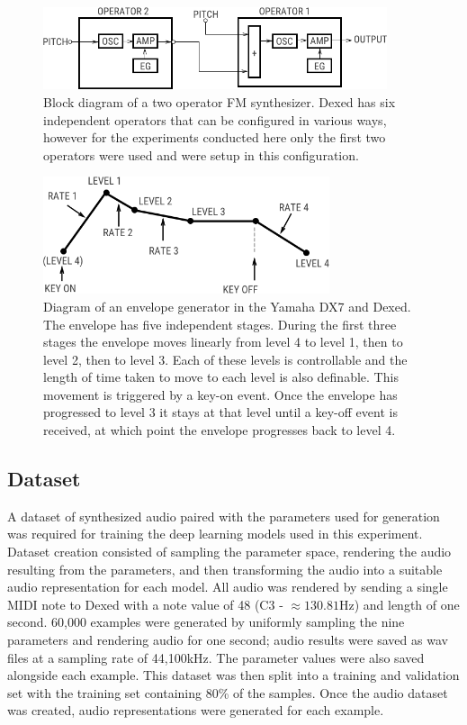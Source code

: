 \begin{figure}[ht]
    \centering
    \includegraphics[width=0.9\textwidth]{figures/spiegelib/two_op_fm_block.png}
    \caption{Block diagram of a two operator FM synthesizer. Dexed has six independent operators that can be configured in various ways, however for the experiments conducted here only the first two operators were used and were setup in this configuration.}
    \label{fig:two_op_fm_block}
\end{figure}

\begin{figure}[ht]
    \centering
    \includegraphics[width=0.75\textwidth]{figures/spiegelib/Yamaha DX7 Envelope.png}
    \caption{Diagram of an envelope generator in the Yamaha DX7 and Dexed. The envelope has five independent stages. During the first three stages the envelope moves linearly from level 4 to level 1, then to level 2, then to level 3. Each of these levels is controllable and the length of time taken to move to each level is also definable. This movement is triggered by a key-on event. Once the envelope has progressed to level 3 it stays at that level until a key-off event is received, at which point the envelope progresses back to level 4.}
    \label{fig:dx7_envelope}
\end{figure}


\subsection{Dataset}
A dataset of synthesized audio paired with the parameters used for generation was required for training the deep learning models used in this experiment. Dataset creation consisted of sampling the parameter space, rendering the audio resulting from the parameters, and then transforming the audio into a suitable audio representation for each model. All audio was rendered by sending a single MIDI note to Dexed with a note value of 48 (C3 - $\approx 130.81$Hz) and length of one second. 60,000 examples were generated by uniformly sampling the nine parameters and rendering audio for one second; audio results were saved as wav files at a sampling rate of 44,100kHz. The parameter values were also saved alongside each example. This dataset was then split into a training and validation set with the training set containing 80\% of the samples. Once the audio dataset was created, audio representations were generated for each example.

